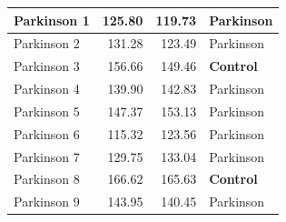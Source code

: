 \documentclass[10pt, conference, compsocconf]{IEEEtran}
\begin{document}
\begin{table}[!h]
\begin{tabular}{|l|l|l|l|}
Parkinson 1         & \multicolumn{1}{r|}{125.80}                                                          & \multicolumn{1}{r|}{119.73}                                                          & Parkinson                                                            \\ \hline
Parkinson 2         & \multicolumn{1}{r|}{131.28}                                                          & \multicolumn{1}{r|}{123.49}                                                          & Parkinson                                                            \\ \hline
Parkinson 3         & \multicolumn{1}{r|}{156.66}                                                          & \multicolumn{1}{r|}{149.46}                                                          & \textbf{Control}                                                            \\ \hline
Parkinson 4         & \multicolumn{1}{r|}{139.90}                                                          & \multicolumn{1}{r|}{142.83}                                                          & Parkinson                                                            \\ \hline
Parkinson 5         & \multicolumn{1}{r|}{147.37}                                                          & \multicolumn{1}{r|}{153.13}                                                          & Parkinson                                                            \\ \hline
Parkinson 6         & \multicolumn{1}{r|}{115.32}                                                          & \multicolumn{1}{r|}{123.56}                                                          & Parkinson                                                            \\ \hline
Parkinson 7         & \multicolumn{1}{r|}{129.75}                                                          & \multicolumn{1}{r|}{133.04}                                                          & Parkinson                                                            \\ \hline
Parkinson 8         & \multicolumn{1}{r|}{166.62}                                                          & \multicolumn{1}{r|}{165.63}                                                          & \textbf{Control}                                                            \\ \hline
Parkinson 9         & \multicolumn{1}{r|}{143.95}                                                          & \multicolumn{1}{r|}{140.45}                                                          & Parkinson                                                            \\ \hline

\end{tabular}
\end{table}
\end{document}
